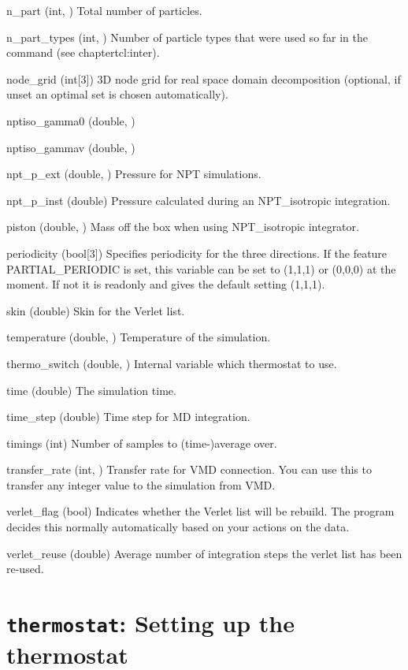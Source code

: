 \begin{globvar}
\item[n_part] (int, \ro) Total number of particles.
\item[n_part_types] (int, \ro) Number of particle types that were
  used so far in the  command (see chapter{tcl:inter}).
\item[node_grid] (int[3]) 3D node grid for real space domain
  decomposition (optional, if unset an optimal set is chosen
  automatically).
\item[nptiso_gamma0] (double, \ro)
\item[nptiso_gammav] (double, \ro)
\item[npt_p_ext] (double, \ro) Pressure for NPT simulations.
\item[npt_p_inst] (double) Pressure calculated during an
  NPT_isotropic integration.
\item[piston] (double, \ro) Mass off the box when using NPT_isotropic
  integrator.
\item[periodicity] (bool[3]) Specifies periodicity for the three
  directions. If the feature PARTIAL_PERIODIC is set, this variable
  can be set to (1,1,1) or (0,0,0) at the moment.  If not it is
  readonly and gives the default setting (1,1,1).
\item[skin] (double) Skin for the Verlet list.
\item [temperature] (double, \ro) Temperature of the
  simulation.
\item[thermo_switch] (double, \ro) Internal variable which thermostat
  to use. 
\item[time] (double) The simulation time.
\item[time_step] (double) Time step for MD integration.
\item[timings] (int) Number of samples to (time-)average over.
\item[transfer_rate] (int, \ro) Transfer rate for VMD connection. You
  can use this to transfer any integer value to the simulation from
  VMD.
\item[verlet_flag] (bool) Indicates whether the Verlet list will be
  rebuild. The program decides this normally automatically based on
  your actions on the data.
\item[verlet_reuse] (double) Average number of integration steps the
  verlet list has been re-used.
\end{globvar}

\section{\texttt{thermostat}: Setting up the thermostat}
\label{sec:thermostat}

